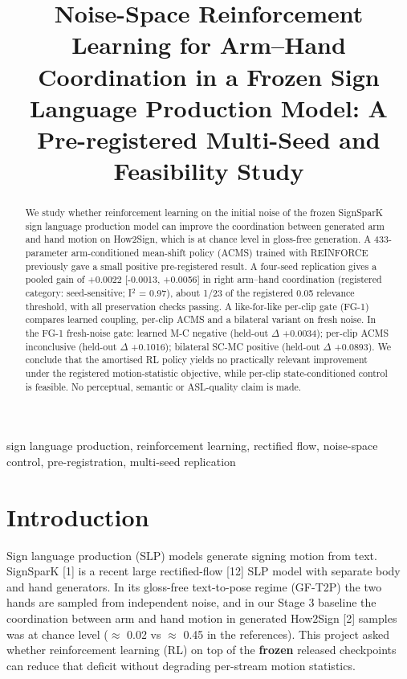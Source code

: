 \documentclass[conference]{IEEEtran}
\begin{document}
\title{Noise-Space Reinforcement Learning for Arm--Hand Coordination in a Frozen Sign Language Production Model: A Pre-registered Multi-Seed and Feasibility Study}
\author{ \and {}}
\maketitle
\begin{abstract}We study whether reinforcement learning on the initial noise of the frozen SignSparK sign language production model can improve the coordination between generated arm and hand motion on How2Sign, which is at chance level in gloss-free generation. A 433-parameter arm-conditioned mean-shift policy (ACMS) trained with REINFORCE previously gave a small positive pre-registered result. A four-seed replication gives a pooled gain of +0.0022 [-0.0013, +0.0056] in right arm--hand coordination (registered category: seed-sensitive; I$^2$ = 0.97), about 1/23 of the registered 0.05 relevance threshold, with all preservation checks passing. A like-for-like per-clip gate (FG-1) compares learned coupling, per-clip ACMS and a bilateral variant on fresh noise. In the FG-1 fresh-noise gate: learned M-C negative (held-out $\Delta$ +0.0034); per-clip ACMS inconclusive (held-out $\Delta$ +0.1016); bilateral SC-MC positive (held-out $\Delta$ +0.0893). We conclude that the amortised RL policy yields no practically relevant improvement under the registered motion-statistic objective, while per-clip state-conditioned control is feasible. No perceptual, semantic or ASL-quality claim is made.\end{abstract}
\begin{IEEEkeywords}sign language production, reinforcement learning, rectified flow, noise-space control, pre-registration, multi-seed replication\end{IEEEkeywords}
\section{Introduction}
Sign language production (SLP) models generate signing motion from text. SignSparK [1] is a recent large rectified-flow [12] SLP model with separate body and hand generators. In its gloss-free text-to-pose regime (GF-T2P) the two hands are sampled from independent noise, and in our Stage 3 baseline the coordination between arm and hand motion in generated How2Sign [2] samples was at chance level ($\approx$ 0.02 vs $\approx$ 0.45 in the references). This project asked whether reinforcement learning (RL) on top of the \textbf{frozen} released checkpoints can reduce that deficit without degrading per-stream motion statistics.
\end{document}
